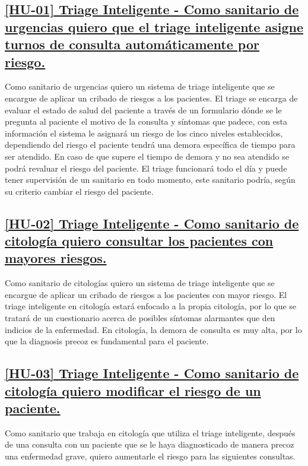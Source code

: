 
\subsection*{\href{https://github.com/RubenDelgadoPareja/TFG-Triage-Inteligente-Consulta-Medica/issues/19}{[HU-01] Triage Inteligente - Como sanitario de urgencias quiero que el triage inteligente asigne turnos de consulta automáticamente por riesgo.}}
Como sanitario de urgencias quiero un sistema de triage inteligente que se encargue de aplicar un cribado de riesgos a los pacientes.
El triage se encarga de evaluar el estado de salud del paciente a través de un formulario dónde se le pregunta al paciente el motivo de la consulta y
síntomas que padece, con esta información el sistema le asignará un riesgo de los cinco niveles establecidos, dependiendo del riesgo el paciente tendrá una demora
específica de tiempo para ser atendido. En caso de que supere el tiempo de demora y no sea atendido se podrá revaluar el riesgo del paciente.
El triage funcionará todo el día y puede tener supervisión de un sanitario en todo momento, este sanitario podría, según su criterio cambiar el riesgo del paciente.

\subsection*{\href{https://github.com/RubenDelgadoPareja/TFG-Triage-Inteligente-Consulta-Medica/issues/101}{[HU-02] Triage Inteligente - Como sanitario de citología quiero consultar los pacientes con mayores riesgos.}}
Como sanitario de citologías quiero un sistema de triage inteligente que se encargue de aplicar un cribado de riesgos a los pacientes con mayor riesgo.
El triage inteligente en citología estará enfocado a la propia citología, por lo que se tratará de un cuestionario acerca de posibles síntomas alarmantes
que den indicios de la enfermedad. En citología, la demora de consulta es muy alta, por lo que la diagnosis precoz es fundamental para el paciente.

\subsection*{\href{https://github.com/RubenDelgadoPareja/TFG-Triage-Inteligente-Consulta-Medica/issues/5}{[HU-03] Triage Inteligente - Como sanitario de citología quiero modificar el riesgo de un paciente.}}
Como sanitario que trabaja en citología que utiliza el triage inteligente, después de una consulta con un paciente que se le haya diagnosticado de manera precoz una enfermedad grave,
quiero aumentarle el riesgo para las siguientes consultas.

